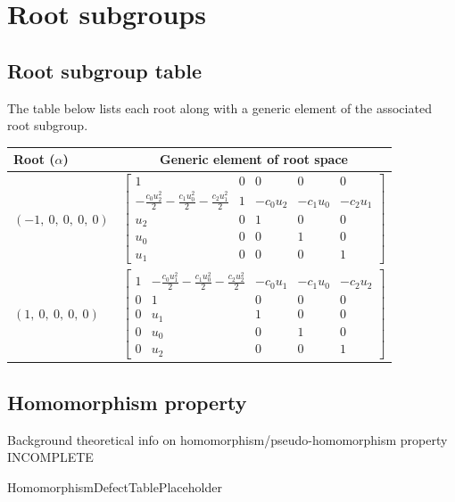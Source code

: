 \documentclass[11pt]{article}
\newcommand{\noi}{\noindent}
\theoremstyle{definition}
\begin{document}
\newpage
\section{Root subgroups}

\subsection{Root subgroup table}

\noi The table below lists each root along with a generic element of the associated root subgroup.

\bigskip

\noindent \begin{tabular}{|l|c|}
    \hline
    \textbf{Root ($\alpha$)} & \textbf{Generic element of root space} \\
    \hline
    $\left( -1, \  0, \  0, \  0, \  0\right)$ & $\left[\begin{matrix}1 & 0 & 0 & 0 & 0\\- \frac{c_{0} u_{2}^{2}}{2} - \frac{c_{1} u_{0}^{2}}{2} - \frac{c_{2} u_{1}^{2}}{2} & 1 & - c_{0} u_{2} & - c_{1} u_{0} & - c_{2} u_{1}\\u_{2} & 0 & 1 & 0 & 0\\u_{0} & 0 & 0 & 1 & 0\\u_{1} & 0 & 0 & 0 & 1\end{matrix}\right]$ \\
    \hline
    $\left( 1, \  0, \  0, \  0, \  0\right)$ & $\left[\begin{matrix}1 & - \frac{c_{0} u_{1}^{2}}{2} - \frac{c_{1} u_{0}^{2}}{2} - \frac{c_{2} u_{2}^{2}}{2} & - c_{0} u_{1} & - c_{1} u_{0} & - c_{2} u_{2}\\0 & 1 & 0 & 0 & 0\\0 & u_{1} & 1 & 0 & 0\\0 & u_{0} & 0 & 1 & 0\\0 & u_{2} & 0 & 0 & 1\end{matrix}\right]$ \\
    \hline
\end{tabular}


\subsection{Homomorphism property}

\noi Background theoretical info on homomorphism/pseudo-homomorphism property INCOMPLETE

\bigskip

HomomorphismDefectTablePlaceholder
\end{document}

